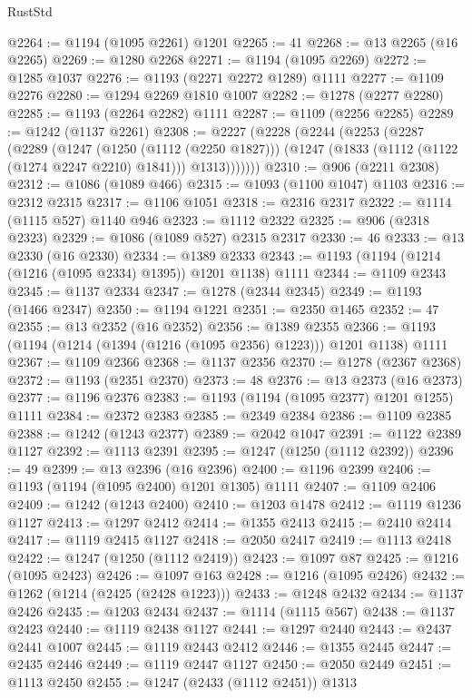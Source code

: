 \begin{lexlean}{RustStd}
\begin{coremodule}
@2264 := @1194 (@1095 @2261) @1201
@2265 := 41
@2268 := @13 @2265 (@16 @2265)
@2269 := @1280 @2268
@2271 := @1194 (@1095 @2269)
@2272 := @1285 @1037
@2276 := @1193 (@2271 @2272 @1289) @1111
@2277 := @1109 @2276
@2280 := @1294 @2269 @1810 @1007
@2282 := @1278 (@2277 @2280)
@2285 := @1193 (@2264 @2282) @1111
@2287 := @1109 (@2256 @2285)
@2289 := @1242 (@1137 @2261)
@2308 := @2227
    (@2228
      (@2244
        (@2253
          (@2287
            (@2289
              (@1247
                (@1250 (@1112 (@2250 @1827)))
                (@1247 (@1833 (@1112 (@1122 (@1274 @2247 @2210) @1841))) @1313)))))))
@2310 := @906 (@2211 @2308)
@2312 := @1086 (@1089 @466)
@2315 := @1093 (@1100 @1047) @1103
@2316 := @2312 @2315
@2317 := @1106 @1051
@2318 := @2316 @2317
@2322 := @1114 (@1115 @527) @1140 @946
@2323 := @1112 @2322
@2325 := @906 (@2318 @2323)
@2329 := @1086 (@1089 @527) @2315 @2317
@2330 := 46
@2333 := @13 @2330 (@16 @2330)
@2334 := @1389 @2333
@2343 := @1193 (@1194 (@1214 (@1216 (@1095 @2334) @1395)) @1201 @1138) @1111
@2344 := @1109 @2343
@2345 := @1137 @2334
@2347 := @1278 (@2344 @2345)
@2349 := @1193 (@1466 @2347)
@2350 := @1194 @1221
@2351 := @2350 @1465
@2352 := 47
@2355 := @13 @2352 (@16 @2352)
@2356 := @1389 @2355
@2366 := @1193 (@1194 (@1214 (@1394 (@1216 (@1095 @2356) @1223))) @1201 @1138) @1111
@2367 := @1109 @2366
@2368 := @1137 @2356
@2370 := @1278 (@2367 @2368)
@2372 := @1193 (@2351 @2370)
@2373 := 48
@2376 := @13 @2373 (@16 @2373)
@2377 := @1196 @2376
@2383 := @1193 (@1194 (@1095 @2377) @1201 @1255) @1111
@2384 := @2372 @2383
@2385 := @2349 @2384
@2386 := @1109 @2385
@2388 := @1242 (@1243 @2377)
@2389 := @2042 @1047
@2391 := @1122 @2389 @1127
@2392 := @1113 @2391
@2395 := @1247 (@1250 (@1112 @2392))
@2396 := 49
@2399 := @13 @2396 (@16 @2396)
@2400 := @1196 @2399
@2406 := @1193 (@1194 (@1095 @2400) @1201 @1305) @1111
@2407 := @1109 @2406
@2409 := @1242 (@1243 @2400)
@2410 := @1203 @1478
@2412 := @1119 @1236 @1127
@2413 := @1297 @2412
@2414 := @1355 @2413
@2415 := @2410 @2414
@2417 := @1119 @2415 @1127
@2418 := @2050 @2417
@2419 := @1113 @2418
@2422 := @1247 (@1250 (@1112 @2419))
@2423 := @1097 @87
@2425 := @1216 (@1095 @2423)
@2426 := @1097 @163
@2428 := @1216 (@1095 @2426)
@2432 := @1262 (@1214 (@2425 (@2428 @1223)))
@2433 := @1248 @2432
@2434 := @1137 @2426
@2435 := @1203 @2434
@2437 := @1114 (@1115 @567)
@2438 := @1137 @2423
@2440 := @1119 @2438 @1127
@2441 := @1297 @2440
@2443 := @2437 @2441 @1007
@2445 := @1119 @2443 @2412
@2446 := @1355 @2445
@2447 := @2435 @2446
@2449 := @1119 @2447 @1127
@2450 := @2050 @2449
@2451 := @1113 @2450
@2455 := @1247 (@2433 (@1112 @2451)) @1313

\end{coremodule}
\end{lexlean}
